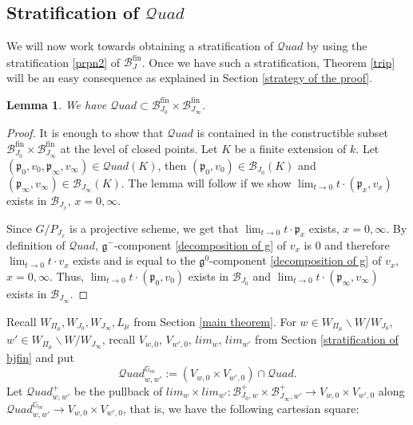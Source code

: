 \documentclass{amsart}
\newcommand{\cB}{\mathcal{B}_{J_{0}}}
\newcommand{\cBi}{\mathcal{B}_{J_{\infty}}}
\newcommand{\cQuad}{\mathcal{Q}uad}
\newcommand{\gm}{\mathbb{G}_{m}}
\newcommand{\clz}{lim_{w}}
\newcommand{\cli}{lim_{w'}}
\theoremstyle{plain}
\newtheorem{lemma}[theorem]{Lemma}
\theoremstyle{definition}
\theoremstyle{remark}
\DeclareMathOperator{\fin}{fin}
\begin{document}
\subsection{Stratification of $\cQuad$}\label{Stratification of quad}
We will now work towards obtaining a 
stratification of $\cQuad$ by using the stratification \eqref{prpn2} of $\mathcal{B}_{J}^{\fin}$.
Once we have such a stratification, Theorem \ref{trip} will be an easy consequence as explained in Section \ref{strategy of the proof}.
\begin{lemma}\label{lemma}
We have $\cQuad\subset\cB^{\fin}\times\cBi^{\fin}$.
\end{lemma}
\begin{proof}
It is enough to show that $\cQuad$ is contained in the constructible subset $\cB^{\fin}\times\cBi^{\fin}$ at the level of closed points. Let $K$ be a finite extension of $k$. Let $(\mathfrak{p}_{0},v_0,\mathfrak{p}_{\infty},v_\infty)\in \cQuad(K
)$, then $(\mathfrak{p}_{0},v_{0})\in\cB(K
)$ and $(\mathfrak{p}_{\infty},v_{\infty})\in\cBi(K)$.
The lemma will follow if we show $\lim_{t\rightarrow 0}t\cdot(\mathfrak{p}_{x},v_{x})$ exists in $\mathcal{B}_{J_{x}}$, $x=0,\infty$.

Since $G/P_{J_{x}}$ is a projective scheme, we get that $\lim_{t\to 0}t\cdot \mathfrak{p}_{x}$ exists, $x=0,\infty$. By definition of $\cQuad$, $\mathfrak{g}^{-}$-component \eqref{decomposition of g} of $v_{x}$ is $0$ and therefore $\lim_{t\to 0}t\cdot v_{x}$
exists and is equal to the $\mathfrak{g}^{0}$-component \eqref{decomposition of g} of $v_{x}$, $x=0,\infty$. 
Thus, $\lim_{t\to 0}t\cdot(\mathfrak{p}_{0},v_0)$ exists in $\mathcal{B}_{J_{0}}$ and $\lim_{t\to 0}t\cdot(\mathfrak{p}_{\infty},v_\infty)$ exists in $\mathcal{B}_{J_{\infty}}$.  
\end{proof}
Recall $W_{\Pi_{\mu}},W_{J_{0}},W_{J_{\infty}},L_{\mu}$ from Section \ref{main theorem}. 
For $w\in W_{\Pi_{\mu}}\backslash W/W_{J_{0}}$, $w'\in W_{\Pi_{\mu}}\backslash W/W_{J_{\infty}}$, recall $V_{w,0}$, $V_{w',0}$, $lim_{w}$, $lim_{w'}$ from Section \ref{stratification of bjfin} and put
\[
\cQuad_{w,w'}^{\gm}:=(V_{w,0}\times V_{w',0})\cap\cQuad.
\] 
Let $\cQuad_{w,w'}^{+}$ be the pullback of
$\clz\times\cli:\mathcal{B}^{+}_{J_{0},w}\times\mathcal{B}^{+}_{J_{\infty},w'}\longrightarrow V_{w,0}\times V_{w',0}$ along $\cQuad_{w,w'}^{\gm}\rightarrow V_{w,0}\times V_{w',0}$, that is, we have the following cartesian square:
\end{document}
